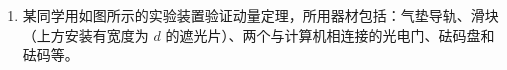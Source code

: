 \documentclass[\gkver]{gaokaozhenti}
\begin{document}
\begin{enumerate}
{根据一次函数关系可知对应斜率为 $\frac{R_{x}R_{V}}{R_{x}+R_{V}}$。

若将电压表接在 O、Q 之间，电流表分压为 $U_{A}=IR_{A}$，根据欧姆定律变形可知 $R=\frac{U-IR_{A}}{I}$，解得：

$U=I(R+R_{\mathrm{A}})$

根据一次函数可知对应斜率为 $R+R_{A}$，对比图像的斜率可知 $k_{1}>k_{II}$

所以 II 图线是采用电压表跨接在 O、P 之间。

（2）因为待测电阻为几十欧姆的电阻，通过图像斜率大致估算待测电阻为 $50\UO$ 左右，根据

$\frac{1\UkO}{50\UO}<\frac{50\UO}{0.5\UO}$

说明电流表的分压较小，电流表的分流较大，所以电压表应跨接在 O、Q 之间，所以选择图线 I 得到的结果较为准确。

根据图像可知

$R_{x}=\frac{3\UV-1\UV}{59.6\UmA-20\UmA}\approx50.5\UO$

（3）考虑电流表内阻，则修正后的电阻为

$R_{\mathrm{x}}^{\prime}=R_{x}-r_{\mathrm{A}}=50.5\UO-0.5\UO=50.0\UO$
}

\item
某同学用如图所示的实验装置验证动量定理，所用器材包括：气垫导轨、滑块（上方安装有宽度为 $d$ 的遮光片）、两个与计算机相连接的光电门、砝码盘和砝码等。



\end{enumerate}
\end{document}
